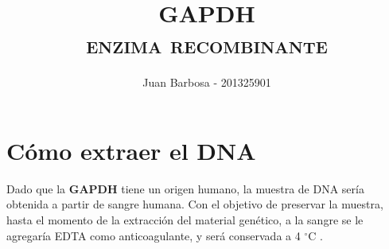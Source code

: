 \documentclass[12pt]{article}
\title{\color{blue} \scshape{GAPDH\\ enzima recombinante}}
\author{Juan Barbosa - 201325901}
\newcommand{\enzima}{\textbf{GAPDH}}
\begin{document}
	\maketitle
	\begin{multicols}{2}
		\footnotesize
		\tableofcontents
	\end{multicols}

	\section{C\'omo extraer el DNA}
		Dado que la \enzima{} tiene un origen humano, la muestra de DNA ser\'ia obtenida a partir de sangre humana. Con el objetivo de preservar la muestra, hasta el momento de la extracci\'on del material gen\'etico, a la sangre se le agregar\'ia EDTA como anticoagulante, y ser\'a conservada a 4 $^\circ$C \cite{m2011human, puregeneBook}.
\end{document}
